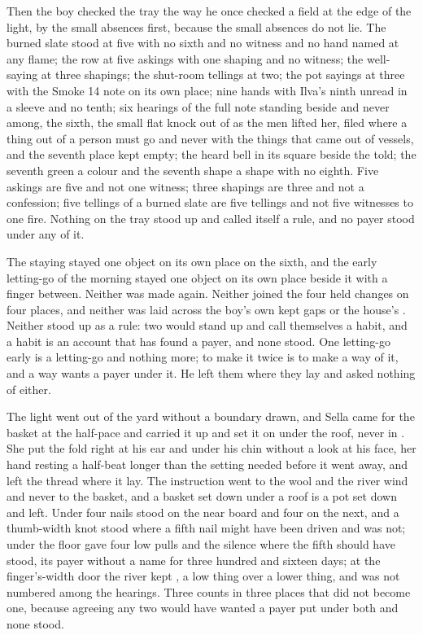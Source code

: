 Then the boy checked the tray the way he once checked a field at the edge of the light, by the small absences first, because the small absences do not lie. The burned slate stood at five with no sixth and no witness and no hand named at any flame; the row at five askings with one shaping and no witness; the well-saying at three shapings; the shut-room tellings at two; the pot sayings at three with the Smoke 14 note on its own place; nine hands with Ilva's ninth unread in a sleeve and no tenth; six hearings of the full note standing beside and never among, the sixth, the small flat knock out of  as the men lifted her, filed where a thing out of a person must go and never with the things that came out of vessels, and the seventh place kept empty; the heard bell in its square beside the told; the seventh green a colour and the seventh shape a shape with no eighth. Five askings are five and not one witness; three shapings are three and not a confession; five tellings of a burned slate are five tellings and not five witnesses to one fire. Nothing on the tray stood up and called itself a rule, and no payer stood under any of it.

The staying stayed one object on its own place on the sixth, and the early letting-go of the morning stayed one object on its own place beside it with a finger between. Neither was made again. Neither joined the four held changes on four places, and neither was laid across the boy's own kept gaps or the house's . Neither stood up as a rule: two would stand up and call themselves a habit, and a habit is an account that has found a payer, and none stood. One letting-go early is a letting-go and nothing more; to make it twice is to make a way of it, and a way wants a payer under it. He left them where they lay and asked nothing of either.

\scenebreak

The light went out of the yard without a boundary drawn, and Sella came for the basket at the half-pace and carried it up and set it on  under the roof, never in . She put the fold right at his ear and under his chin without a look at his face, her hand resting a half-beat longer than the setting needed before it went away, and left the thread where it lay. The instruction went to the wool and the river wind and never to the basket, and a basket set down under a roof is a pot set down and left. Under  four nails stood on the near board and four on the next, and a thumb-width knot stood where a fifth nail might have been driven and was not; under the floor  gave four low pulls and the silence where the fifth should have stood, its payer without a name for three hundred and sixteen days; at the finger's-width door the river kept , a low thing over a lower thing, and was not numbered among the hearings. Three counts in three places that did not become one, because agreeing any two would have wanted a payer put under both and none stood.

